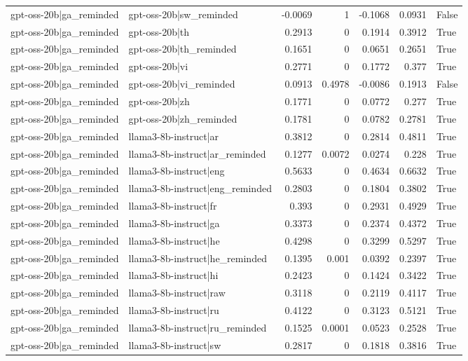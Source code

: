 \begin{table}
\begin{tabular}{l l r r r r l}
gpt-oss-20b|ga_reminded & gpt-oss-20b|sw_reminded & -0.0069 & 1 & -0.1068 & 0.0931 & False \\
gpt-oss-20b|ga_reminded & gpt-oss-20b|th & 0.2913 & 0 & 0.1914 & 0.3912 & True \\
gpt-oss-20b|ga_reminded & gpt-oss-20b|th_reminded & 0.1651 & 0 & 0.0651 & 0.2651 & True \\
gpt-oss-20b|ga_reminded & gpt-oss-20b|vi & 0.2771 & 0 & 0.1772 & 0.377 & True \\
gpt-oss-20b|ga_reminded & gpt-oss-20b|vi_reminded & 0.0913 & 0.4978 & -0.0086 & 0.1913 & False \\
gpt-oss-20b|ga_reminded & gpt-oss-20b|zh & 0.1771 & 0 & 0.0772 & 0.277 & True \\
gpt-oss-20b|ga_reminded & gpt-oss-20b|zh_reminded & 0.1781 & 0 & 0.0782 & 0.2781 & True \\
gpt-oss-20b|ga_reminded & llama3-8b-instruct|ar & 0.3812 & 0 & 0.2814 & 0.4811 & True \\
gpt-oss-20b|ga_reminded & llama3-8b-instruct|ar_reminded & 0.1277 & 0.0072 & 0.0274 & 0.228 & True \\
gpt-oss-20b|ga_reminded & llama3-8b-instruct|eng & 0.5633 & 0 & 0.4634 & 0.6632 & True \\
gpt-oss-20b|ga_reminded & llama3-8b-instruct|eng_reminded & 0.2803 & 0 & 0.1804 & 0.3802 & True \\
gpt-oss-20b|ga_reminded & llama3-8b-instruct|fr & 0.393 & 0 & 0.2931 & 0.4929 & True \\
gpt-oss-20b|ga_reminded & llama3-8b-instruct|ga & 0.3373 & 0 & 0.2374 & 0.4372 & True \\
gpt-oss-20b|ga_reminded & llama3-8b-instruct|he & 0.4298 & 0 & 0.3299 & 0.5297 & True \\
gpt-oss-20b|ga_reminded & llama3-8b-instruct|he_reminded & 0.1395 & 0.001 & 0.0392 & 0.2397 & True \\
gpt-oss-20b|ga_reminded & llama3-8b-instruct|hi & 0.2423 & 0 & 0.1424 & 0.3422 & True \\
gpt-oss-20b|ga_reminded & llama3-8b-instruct|raw & 0.3118 & 0 & 0.2119 & 0.4117 & True \\
gpt-oss-20b|ga_reminded & llama3-8b-instruct|ru & 0.4122 & 0 & 0.3123 & 0.5121 & True \\
gpt-oss-20b|ga_reminded & llama3-8b-instruct|ru_reminded & 0.1525 & 0.0001 & 0.0523 & 0.2528 & True \\
gpt-oss-20b|ga_reminded & llama3-8b-instruct|sw & 0.2817 & 0 & 0.1818 & 0.3816 & True \\

\end{tabular}
\end{table}
